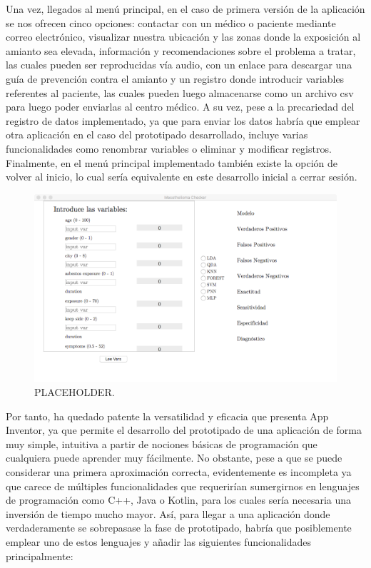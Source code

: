 \documentclass{article}
\begin{document}
Una vez, llegados al menú principal, en el caso de primera versión  de
la aplicación se nos ofrecen cinco opciones: contactar con un médico o
paciente mediante correo electrónico, visualizar nuestra  ubicación  y
las zonas donde la exposición al amianto sea  elevada,	información  y
recomendaciones sobre el problema a  tratar,  las  cuales  pueden  ser
reproducidas vía audio, con un	enlace	para  descargar  una  guía  de
prevención contra el amianto y un registro donde introducir  variables
referentes al paciente, las cuales pueden luego  almacenarse  como  un
archivo csv para luego poder enviarlas al centro médico.   A  su  vez,
pese a la precariedad del registro de datos implementado, ya que  para
enviar los datos habría que emplear otra aplicación  en  el  caso  del
prototipado  desarrollado,   incluye   varias	funcionalidades   como
renombrar variables o eliminar y modificar registros.  Finalmente,  en
el menú principal implementado también existe la opción de  volver  al
inicio, lo cual sería equivalente en este desarrollo inicial a	cerrar
sesión.

\newpage
\begin{figure}[h]
\centering
\includegraphics[width = 0.9\linewidth]{../images/s1.png}
\caption{PLACEHOLDER.}
\end{figure}

Por tanto, ha quedado patente la versatilidad y eficacia que  presenta
App Inventor, ya que permite el  desarrollo  del  prototipado  de  una
aplicación de forma muy simple, intuitiva a partir de nociones básicas
de programación que cualquiera	puede  aprender  muy  fácilmente.   No
obstante, pese a que se  puede	considerar  una  primera  aproximación
correcta, evidentemente es  incompleta	ya  que  carece  de  múltiples
funcionalidades  que   requerirían   sumergirnos   en	lenguajes   de
programación como C++, Java o Kotlin, para los cuales sería  necesaria
una inversión de tiempo mucho mayor. Así, para llegar a una aplicación
donde verdaderamente se sobrepasase la fase de prototipado, habría que
posiblemente emplear uno de estos lenguajes y  añadir  las  siguientes
funcionalidades principalmente:
\end{document}
